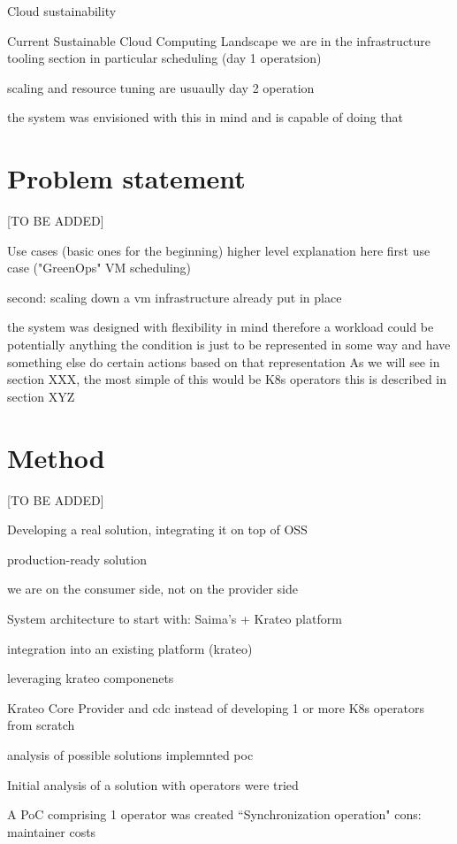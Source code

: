 Cloud sustainability

Current Sustainable Cloud Computing Landscape
we are in the infrastructure tooling section
in particular scheduling (day 1 operatsion)

scaling and resource tuning are usuaully day 2 operation

the system was envisioned with this in mind and is capable of doing that

\section{Problem statement}
\label{sec:problem}

[TO BE ADDED]

Use cases (basic ones for the beginning) higher level explanation here
first use case ("GreenOps" VM scheduling)

second: scaling down a vm 
infrastructure already put in place

the system was designed with flexibility in mind therefore a workload could be potentially anything
the condition is just to be represented in some way and have something else do certain actions based on that representation
As we will see in section XXX, the most simple of this would be K8s operators
this is described in section XYZ

\section{Method}

[TO BE ADDED]

Developing a real solution, integrating it on top of OSS

production-ready solution

we are on the consumer side, not on the provider side

System architecture to start with: Saima's + Krateo platform

integration into an existing platform (krateo)

leveraging krateo componenets

Krateo Core Provider and cdc instead of developing 1 or more K8s operators from scratch


analysis of possible solutions
implemnted poc 

Initial analysis of a solution with operators were tried

A PoC comprising 1 operator was created 
``Synchronization operation"
cons: maintainer costs

